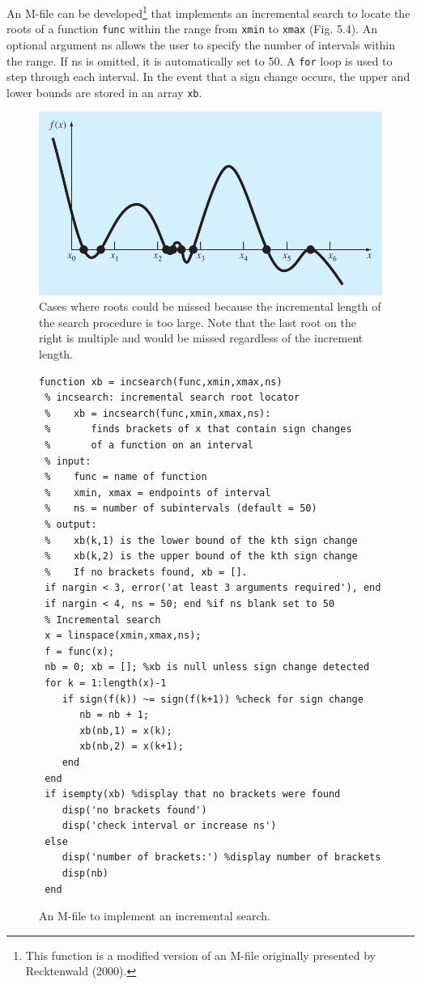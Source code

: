 \documentclass[../main.tex]{subfiles}
\begin{document}
An M-file can be developed\footnote{This function is a modified version of an M-file originally
presented by Recktenwald (2000).} that implements an incremental search to locate the roots
of a function \texttt{func} within the range from \texttt{xmin} to \texttt{xmax} (Fig. 5.4). An optional argument
ns allows the user to specify the number of intervals within the range. If ns is omitted, it
is automatically set to 50. A \texttt{for} loop is used to step through each interval. In the event that
a sign change occurs, the upper and lower bounds are stored in an array \texttt{xb}.\\

\bigskip
\begin{figure}[h]
    \includegraphics[width=0.8\linewidth]{./images/fig_5_3}
    \caption{Cases where roots could be missed because the incremental length of the search procedure is
    too large. Note that the last root on the right is multiple and would be missed regardless of the
    increment length.}
\end{figure}
\newpage

\begin{figure}[h]
    \begin{lstlisting}[numbers=none]
 function xb = incsearch(func,xmin,xmax,ns)
 % incsearch: incremental search root locator
 %    xb = incsearch(func,xmin,xmax,ns):
 %       finds brackets of x that contain sign changes
 %       of a function on an interval
 % input:
 %    func = name of function
 %    xmin, xmax = endpoints of interval
 %    ns = number of subintervals (default = 50)
 % output:
 %    xb(k,1) is the lower bound of the kth sign change
 %    xb(k,2) is the upper bound of the kth sign change
 %    If no brackets found, xb = [].
 if nargin < 3, error('at least 3 arguments required'), end
 if nargin < 4, ns = 50; end %if ns blank set to 50
 % Incremental search
 x = linspace(xmin,xmax,ns);
 f = func(x);
 nb = 0; xb = []; %xb is null unless sign change detected
 for k = 1:length(x)-1
    if sign(f(k)) ~= sign(f(k+1)) %check for sign change
       nb = nb + 1;
       xb(nb,1) = x(k);
       xb(nb,2) = x(k+1);
    end
 end
 if isempty(xb) %display that no brackets were found
    disp('no brackets found')
    disp('check interval or increase ns')
 else
    disp('number of brackets:') %display number of brackets
    disp(nb)
 end
    \end{lstlisting}
    \caption{An M-file to implement an incremental search.}
\end{figure}
\end{document}
